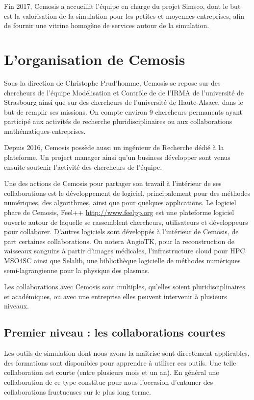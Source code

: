 \documentclass[12pt,a4paper]{article}
\begin{document}
 Fin 2017, Cemosis a accueillit l'équipe en charge du projet Simseo, dont le but est la valorisation de la simulation pour les petites et moyennes entreprises, afin de fournir une vitrine homogène de services autour de la simulation.
 

\vspace{1cm}

\section*{L'organisation de Cemosis}

Sous la direction de Christophe Prud'homme, Cemosis se repose sur des chercheurs de l'équipe Modélisation et Contrôle de de l'IRMA de l'université de Strasbourg ainsi que sur des chercheurs de l'université de Haute-Alsace, dans le but de remplir ses missions. On compte environ 9 chercheurs permanents ayant participé aux activités de recherche pluridisciplinaires ou aux collaborations mathématiques-entreprises.

Depuis 2016, Cemosis possède aussi un ingénieur de Recherche dédié à la plateforme. Un project manager ainsi qu'un business développer sont venus ensuite	 soutenir l'activité des chercheurs de l'équipe.

Une des actions de Cemosis pour partager son travail à l'intérieur de ses collaborations est le développement de logiciel, principalement pour des méthodes numériques, des algorithmes, ainsi que pour quelques applications.
Le logiciel phare de Cemosis, Feel++ \url{http://www.feelpp.org} est une plateforme logiciel ouverte autour de laquelle se rassemblent chercheurs, utilisateurs et développeurs pour collaborer.
D'autres logiciels sont développés à l'intérieur de Cemosis, de part certaines collaborations. On notera AngioTK, pour la reconstruction de vaisseaux sanguins à partir d'images médicales, l'infrastructure cloud pour HPC MSO4SC ainsi que Selalib, une bibliothèque logicielle de méthodes numériques semi-lagrangienne pour la physique des plasmas.

Les collaborations avec Cemosis sont multiples, qu'elles soient pluridisciplinaires et académiques, ou avec une entreprise elles peuvent intervenir à plusieurs niveaux.

\subsection*{Premier niveau : les collaborations courtes}
Les outils de simulation dont nous avons la maîtrise sont directement applicables, des formations sont disponibles pour apprendre à utiliser ces outils. Une telle collaboration est courte (entre plusieurs mois et un an). En général une collaboration de ce type constitue pour nous l'occasion d'entamer des collaborations fructueuses sur le plus long terme. 
\end{document}
